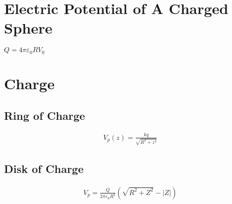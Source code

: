 \documentclass[12pt]{article}
\begin{document}
\section{Electric Potential of A Charged Sphere}
$Q=4 \pi \varepsilon_0 R V_0$
\section{Charge}
\subsection{Ring of Charge}
\begin{align*}
V_p(z)=\frac{kq}{\sqrt{R^2+z^2}}
\end{align*}
\subsection{Disk of Charge}
\begin{align*}
V_p=\frac{Q}{2 \pi \varepsilon_0 R^2}(\sqrt{R^2+Z^2}-|Z|)
\end{align*}
\end{document}
